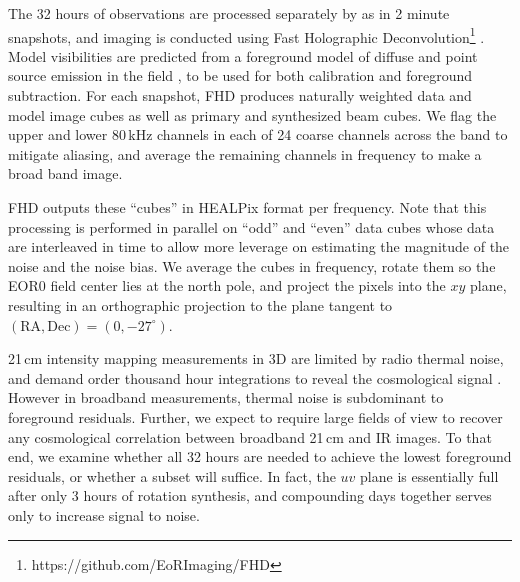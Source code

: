 \documentclass[preprint]{aastex}
\begin{document}
The 32 hours of observations are processed separately by \citet{beardsley16} as in 2 minute snapshots, and imaging is conducted using Fast Holographic Deconvolution\footnote{https://github.com/EoRImaging/FHD} \citep{fhd}. Model visibilities are predicted from a foreground model of diffuse and point source emission in the field \citep{beardsley16,PattiCatalog1}, to be used for both calibration and foreground subtraction. For each snapshot, FHD produces naturally weighted data and model image cubes as well as primary and synthesized beam cubes. We flag the upper and lower 80\,kHz channels in each of 24 coarse channels across the band to mitigate aliasing, and average the remaining channels in frequency to make a broad band image. 

FHD outputs these ``cubes'' in HEALPix format per frequency. Note that this processing is performed in parallel on ``odd'' and ``even'' data cubes whose data are interleaved in time to allow more leverage on estimating the magnitude of the noise and the noise bias. We average the cubes in frequency, rotate them so the EOR0 field center lies at the north pole, and project the pixels into the $xy$ plane, resulting in an orthographic projection to the plane tangent to  $(\text{RA}, \text{Dec})=(0,-27^\circ)$.

21\,cm intensity mapping measurements in 3D are limited by radio thermal noise, and demand order thousand hour integrations to reveal the cosmological signal \citep{beardsley13,PoberNextGen}. However in broadband measurements, thermal noise is subdominant to foreground residuals. Further, we expect to require large fields of view to recover any cosmological correlation between broadband 21\,cm and IR images. To that end, we examine whether all 32 hours are needed to achieve the lowest foreground residuals, or whether a subset will suffice. In fact, the $uv$ plane is essentially full after only 3 hours of rotation synthesis, and compounding days together serves only to increase signal to noise. 
\end{document}
